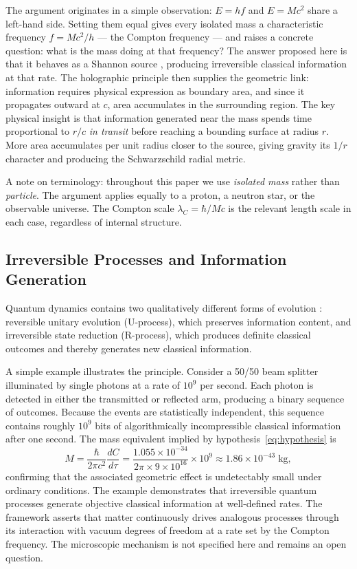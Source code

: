 \documentclass[12pt]{article}
\begin{document}
The argument originates in a simple observation: $E = hf$ and $E = Mc^2$
share a left-hand side.
Setting them equal gives every isolated mass a characteristic frequency
$f = Mc^2/h$ --- the Compton frequency --- and raises a concrete
question: what is the mass doing at that frequency?
The answer proposed here is that it behaves as a Shannon source
\cite{Shannon1948}, producing irreversible classical information at that
rate.
The holographic principle then supplies the geometric link: information
requires physical expression as boundary area, and since it propagates
outward at $c$, area accumulates in the surrounding region.
The key physical insight is that information generated near the mass
spends time proportional to $r/c$ \emph{in transit} before reaching
a bounding surface at radius $r$.
More area accumulates per unit radius closer to the source, giving
gravity its $1/r$ character and producing the Schwarzschild radial
metric.

A note on terminology: throughout this paper we use \emph{isolated mass}
rather than \emph{particle}.
The argument applies equally to a proton, a neutron star, or the
observable universe.
The Compton scale $\lambda_C = \hbar/Mc$ is the relevant length scale
in each case, regardless of internal structure.

\subsection{Irreversible Processes and Information Generation}
\label{sec:irreversible}

Quantum dynamics contains two qualitatively different forms of
evolution \cite{Penrose1994}: reversible unitary evolution (U-process),
which preserves information content, and irreversible state reduction
(R-process), which produces definite classical outcomes and thereby
generates new classical information.

A simple example illustrates the principle.
Consider a 50/50 beam splitter illuminated by single photons at a rate
of $10^9$ per second.
Each photon is detected in either the transmitted or reflected arm,
producing a binary sequence of outcomes.
Because the events are statistically independent, this sequence contains
roughly $10^9$ bits of algorithmically incompressible classical
information after one second.
The mass equivalent implied by hypothesis~\eqref{eq:hypothesis} is
\begin{equation}
  M = \frac{\hbar}{2\pi c^2}\frac{dC}{d\tau}
    = \frac{1.055\times10^{-34}}{2\pi \times 9\times10^{16}}
      \times 10^9
    \approx 1.86\times10^{-43}\;\text{kg},
\end{equation}
confirming that the associated geometric effect is undetectably small
under ordinary conditions.
The example demonstrates that irreversible quantum processes generate
objective classical information at well-defined rates.
The framework asserts that matter continuously drives analogous processes
through its interaction with vacuum degrees of freedom at a rate set by
the Compton frequency.
The microscopic mechanism is not specified here and remains an open
question.
\end{document}
